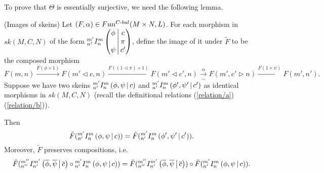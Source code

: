 \noindent To prove that $\Theta$ is essentially surjective, we need the following
lemma.

\begin{lemma} (Images of skeins) \label{lemma/image-of-skein}
  \noindent
  Let $(F,\alpha) \in Fun^{C{\text -}bal}(M \times N, L)$. For each morphism
  in $sk(M,C,N)$ of the form ${}^{m'}_{n'} I^{m}_{n} \left( \begin{matrix} \phi \\ {}\\ \psi \end{matrix} \,\middle|\, \begin{matrix} c \\ \pi \\ c' \end{matrix} \right)$,
  define the image of it under $\tilde{F}$ to be the composed morphism
  \[
    F(m,n)
    \xrightarrow{F(\phi \times 1)}
    F(m' \lhd c, n)
    \xrightarrow{F((1 \lhd \pi) \times 1)}
    F(m' \lhd c', n)
    \xrightarrow[\sim]{\alpha}
    F(m', c' \rhd n)
    \xrightarrow{F(1 \times \psi)}
    F(m',n').
  \]
  Suppose we have two skeins ${}^{m'}_{n'} I^{m}_{n} \left( \phi, \psi \,\middle|\, c \right)$ and
  $ {}^{m'}_{n'} I^{m}_{n} \left( \phi', \psi' \,\middle|\, c' \right)$ as identical morphisms in $sk(M,C,N)$
  (recall the definitional relations (\ref{relation/a}) (\ref{relation/b})).

  \noindent Then
  \begin{equation} \label{eqn/a}
    \tilde{F}({}^{m'}_{n'} I^{m}_{n} \left( \phi, \psi \,\middle|\, c \right)) = \tilde{F}({}^{m'}_{n'} I^{m}_{n} \left( \phi', \psi' \,\middle|\, c' \right)).
  \end{equation}
  Moreover, $\tilde{F}$ preserves compositions, i.e.
  \begin{equation} \label{eqn/b}
    \tilde{F}({}^{m''}_{n''} I^{m'}_{n'} \left( \overline{\phi}, \overline{\psi} \,\middle|\, \overline{c} \right) \circ {}^{m'}_{n'} I^{m}_{n} \left( \phi, \psi \,\middle|\, c \right))
    = \tilde{F}({}^{m''}_{n''} I^{m'}_{n'} \left( \overline{\phi}, \overline{\psi} \,\middle|\, \overline{c} \right))
    \circ
    \tilde{F}({}^{m'}_{n'} I^{m}_{n} \left( \phi, \psi \,\middle|\, c \right)).
  \end{equation}
\end{lemma}

